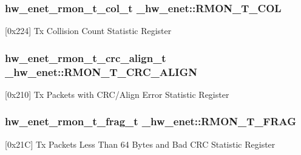 \subsubsection[{\texorpdfstring{R\+M\+O\+N\+\_\+\+T\+\_\+\+C\+OL}{RMON_T_COL}}]{ {\bf hw\+\_\+enet\+\_\+rmon\+\_\+t\+\_\+col\+\_\+t} \+\_\+hw\+\_\+enet\+::\+R\+M\+O\+N\+\_\+\+T\+\_\+\+C\+OL}\hypertarget{struct__hw__enet_acd048545970591f69a1ee092549e274b}{}\label{struct__hw__enet_acd048545970591f69a1ee092549e274b}
\mbox{[}0x224\mbox{]} Tx Collision Count Statistic Register 
\subsubsection[{\texorpdfstring{R\+M\+O\+N\+\_\+\+T\+\_\+\+C\+R\+C\+\_\+\+A\+L\+I\+GN}{RMON_T_CRC_ALIGN}}]{ {\bf hw\+\_\+enet\+\_\+rmon\+\_\+t\+\_\+crc\+\_\+align\+\_\+t} \+\_\+hw\+\_\+enet\+::\+R\+M\+O\+N\+\_\+\+T\+\_\+\+C\+R\+C\+\_\+\+A\+L\+I\+GN}\hypertarget{struct__hw__enet_a6ae18184cdd318706d4c953b523b5684}{}\label{struct__hw__enet_a6ae18184cdd318706d4c953b523b5684}
\mbox{[}0x210\mbox{]} Tx Packets with C\+R\+C/\+Align Error Statistic Register 
\subsubsection[{\texorpdfstring{R\+M\+O\+N\+\_\+\+T\+\_\+\+F\+R\+AG}{RMON_T_FRAG}}]{ {\bf hw\+\_\+enet\+\_\+rmon\+\_\+t\+\_\+frag\+\_\+t} \+\_\+hw\+\_\+enet\+::\+R\+M\+O\+N\+\_\+\+T\+\_\+\+F\+R\+AG}\hypertarget{struct__hw__enet_aa5588448acf96bd6b498681cd240f808}{}\label{struct__hw__enet_aa5588448acf96bd6b498681cd240f808}
\mbox{[}0x21C\mbox{]} Tx Packets Less Than 64 Bytes and Bad C\+RC Statistic Register 
